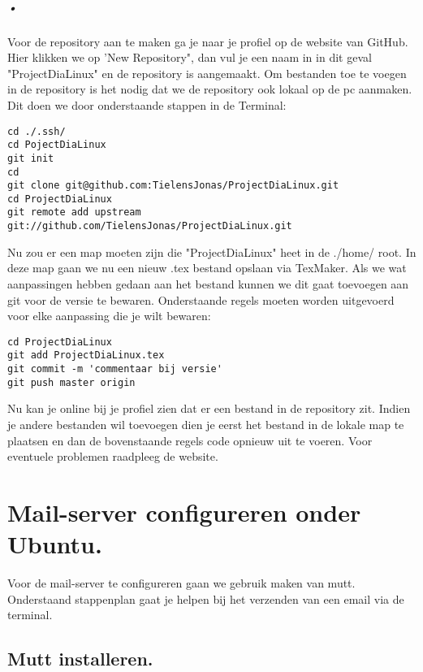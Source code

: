 \documentclass[A4Paper,11pt]{report}
\begin{document}
\paragraph{•}
Voor de repository aan te maken ga je naar je profiel op de website van GitHub. Hier klikken we op 'New Repository", dan vul je een naam in in dit geval "ProjectDiaLinux" en de repository is aangemaakt.
Om bestanden toe te voegen in de repository is het nodig dat we de repository ook lokaal op de pc aanmaken. Dit doen we door onderstaande stappen in de Terminal:
\begin{lstlisting}
cd ./.ssh/
cd PojectDiaLinux
git init
cd
git clone git@github.com:TielensJonas/ProjectDiaLinux.git
cd ProjectDiaLinux
git remote add upstream git://github.com/TielensJonas/ProjectDiaLinux.git
\end{lstlisting}
Nu zou er een map moeten zijn die "ProjectDiaLinux" heet in de ./home/ root. In deze map gaan we nu een nieuw .tex bestand opslaan via TexMaker.
Als we wat aanpassingen hebben gedaan aan het bestand kunnen we dit gaat toevoegen aan git voor de versie te bewaren. 
Onderstaande regels moeten worden uitgevoerd voor elke aanpassing die je wilt bewaren:
\begin{lstlisting}
cd ProjectDiaLinux
git add ProjectDiaLinux.tex
git commit -m 'commentaar bij versie'
git push master origin
\end{lstlisting}
Nu kan je online bij je profiel zien dat er een bestand in de repository zit. Indien je andere bestanden wil toevoegen dien je eerst het bestand in de lokale map te plaatsen en dan de bovenstaande regels code opnieuw uit te voeren.
Voor eventuele problemen raadpleeg de website.
\newpage
\renewcommand{\appendixname}{Bijlage}
\chapter{Mail-server configureren onder Ubuntu.}
Voor de mail-server te configureren gaan we gebruik maken van mutt. Onderstaand stappenplan gaat je helpen bij het verzenden van een email via de terminal.
\section{Mutt installeren.}
\end{document}
